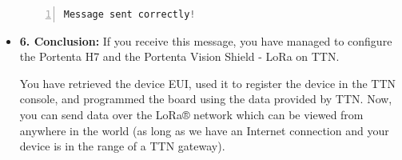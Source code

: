 \begin{itemize}
	\begin{lstlisting}[language=C++, frame=single, numbers=left, basicstyle=\ttfamily\small]
		Message sent correctly!
	\end{lstlisting}
	
	\item \textbf{6. Conclusion:} If you receive this message, you have managed to configure the Portenta H7 and the Portenta Vision Shield - LoRa on TTN.
	
	You have retrieved the device EUI, used it to register the device in the TTN console, and programmed the board using the data provided by TTN. Now, you can send data over the LoRa® network which can be viewed from anywhere in the world (as long as we have an Internet connection and your device is in the range of a TTN gateway). \cite{connecting_to_ttn_portenta_vision_shield:2024}
	
\end{itemize}




